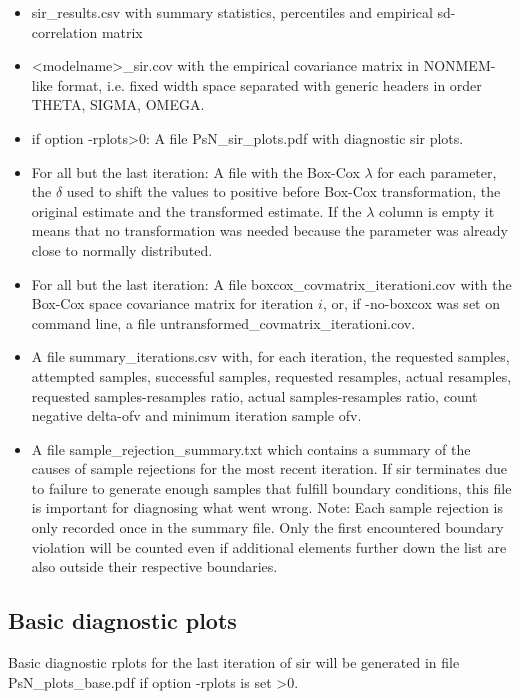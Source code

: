 \begin{itemize}
\item sir\_results.csv with summary statistics, percentiles and empirical sd-correlation matrix 
\item <modelname>\_sir.cov with the empirical covariance matrix in NONMEM-like format, i.e. fixed width space separated with generic headers in order THETA, SIGMA, OMEGA.
\item if option -rplots>0: A file PsN\_sir\_plots.pdf with diagnostic sir plots.
\item For all but the last iteration: A file with the Box-Cox $\lambda$ for each parameter, the $\delta$ used to shift
the values to positive before Box-Cox transformation, the original estimate and the transformed estimate. If the $\lambda$ column is empty it means that no transformation was needed because the parameter was already close to normally distributed.
\item For all but the last iteration: A file boxcox\_covmatrix\_iterationi.cov with the Box-Cox space covariance matrix for iteration $i$, or, if -no-boxcox was set on command line, a file untransformed\_covmatrix\_iterationi.cov.
\item A file summary\_iterations.csv with, for each iteration, the requested samples, attempted samples, successful samples, requested resamples, actual resamples, requested samples-resamples ratio, actual samples-resamples ratio, count negative delta-ofv and minimum iteration sample ofv.
\item A file sample\_rejection\_summary.txt which contains a summary of the causes of sample rejections for the most recent iteration. If sir terminates due to failure to generate enough samples that fulfill boundary conditions, this file
is important for diagnosing what went wrong. Note: Each sample rejection is only recorded once in the summary file.
Only the first encountered boundary violation will be counted even if additional elements further down the list are also outside their respective boundaries.
\end{itemize}

\subsection{Basic diagnostic plots}
Basic diagnostic rplots for the last iteration of sir will be generated in file  PsN\_plots\_base.pdf if option -rplots is set >0.

